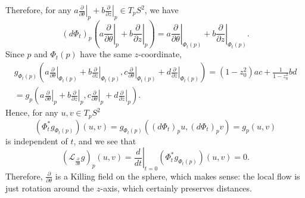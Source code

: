 \begin{example}
	Therefore, for any $a \left.\frac{\partial}{\partial \theta}\right|_p + b \left.\frac{\partial}{\partial z}\right|_p\in T_pS^2$, we have
	\[
		(d\Phi_t)_p \left(a \left.\frac{\partial}{\partial \theta}\right|_p + b \left.\frac{\partial}{\partial z}\right|_p\right) = a \left.\frac{\partial}{\partial \theta}\right|_{\Phi_t(p)} + b \left.\frac{\partial}{\partial z}\right|_{\Phi_t(p)}.
	\]
	Since $p$ and $\Phi_t(p)$ have the same $z$-coordinate,
	\begin{multline*}
		g_{\Phi_t(p)} \left( a \left.\frac{\partial}{\partial \theta}\right|_{\Phi_t(p)} + b \left.\frac{\partial}{\partial z}\right|_{\Phi_t(p)}, c \left.\frac{\partial}{\partial \theta}\right|_{\Phi_t(p)} + d \left.\frac{\partial}{\partial z}\right|_{\Phi_t(p)}\right) = (1-z_0^2)ac + \frac{1}{1-z_0^2}bd \\
		= g_p\left(a \left.\frac{\partial}{\partial \theta}\right|_p + b \left.\frac{\partial}{\partial z}\right|_p,c \left.\frac{\partial}{\partial \theta}\right|_p + d \left.\frac{\partial}{\partial z}\right|_p\right).
	\end{multline*}
	Hence, for any $u,v \in T_p S^2$
	\[
		(\Phi_t^\ast g_{\Phi_t(p)})(u,v) = g_{\Phi_t(p)}((d\Phi_t)_pu,(d\Phi_t)_pv) = g_p(u,v)
	\]
	is independent of $t$, and we see that
	\[
		(\mathcal{L}_{\frac{\partial}{\partial \theta}} g)_p(u,v) = \left. \frac{d}{dt}\right|_{t=0} (\Phi_t^\ast g_{\Phi_t(p)})(u,v) = 0.
	\]
	Therefore, $\frac{\partial}{\partial \theta}$ is a Killing field on the sphere, which makes sense: the local flow is just rotation around the $z$-axis, which certainly preserves distances.
	

\end{example}
